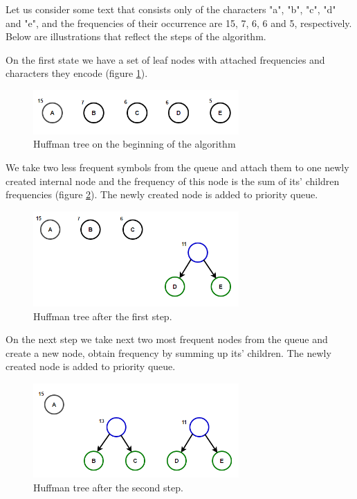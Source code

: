 Let us consider some text that consists only of the characters "a", "b", "c", "d" and "e", and the frequencies of their occurrence are 15, 7, 6, 6 and 5, respectively. Below are illustrations that reflect the steps of the algorithm.

On the first state we have a set of leaf nodes with attached frequencies and characters they encode (figure \ref{huffman-0}).

\begin{figure}[!ht]
    \centering
    \includegraphics[width=0.7\textwidth]{figure/huffman-0.png}
    \caption{Huffman tree on the beginning of the algorithm}
    \label{huffman-0}
\end{figure}

We take two less frequent symbols from the queue and attach them to one newly created internal node and the frequency of this node is the sum of its' children frequencies (figure \ref{huffman-1}). The newly created node is added to priority queue.

\begin{figure}[!ht]
    \centering
    \includegraphics[width=0.7\textwidth]{figure/huffman-1.png}
    \caption{Huffman tree after the first step.}
    \label{huffman-1}
\end{figure}

On the next step we take next two most frequent nodes from the queue and create a new node, obtain frequency by summing up its' children. The newly created node is added to priority queue.

\begin{figure}[!ht]
    \centering
    \includegraphics[width=0.7\textwidth]{figure/huffman-2.png}
    \caption{Huffman tree after the second step.}
    \label{huffman-2}
\end{figure}

